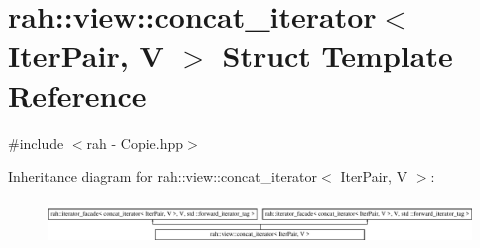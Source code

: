\hypertarget{structrah_1_1view_1_1concat__iterator}{}\section{rah\+::view\+::concat\+\_\+iterator$<$ Iter\+Pair, V $>$ Struct Template Reference}
\label{structrah_1_1view_1_1concat__iterator}


{\ttfamily \#include $<$rah -\/ Copie.\+hpp$>$}

Inheritance diagram for rah\+::view\+::concat\+\_\+iterator$<$ Iter\+Pair, V $>$\+:\begin{figure}[H]
\begin{center}
\leavevmode
\includegraphics[height=1.138211cm]{structrah_1_1view_1_1concat__iterator}
\end{center}
\end{figure}
